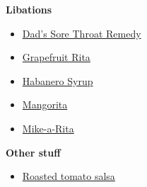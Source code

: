 \documentclass{article}
\begin{document}
\medskip

\textbf{Libations}
\begin{itemize}
    \item \href{hot-toddy.pdf}{Dad's Sore Throat Remedy}
    \item \href{grapefruit-rita.pdf}{Grapefruit Rita}
    \item \href{habanero-syrup.pdf}{Habanero Syrup}
    \item \href{mango-rita.pdf}{Mangorita}
    \item \href{mike-a-rita.pdf}{Mike-a-Rita}
\end{itemize}

\medskip

\textbf{Other stuff}
\begin{itemize}
    \item \href{salsa.pdf}{Roasted tomato salsa}
\end{itemize}
\end{document}
